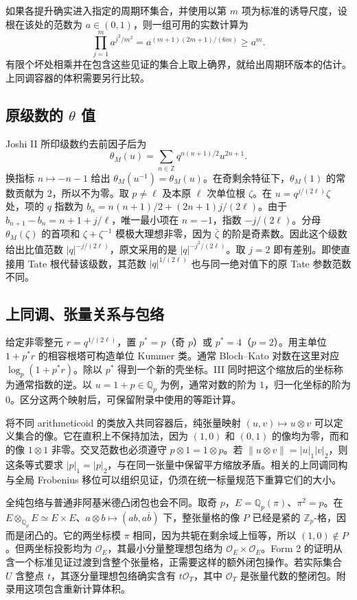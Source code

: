 \documentclass[UTF8,fontset=none,zihao=-4,a4paper]{ctexart}
\newcommand{\OO}{\mathcal O}
\newcommand{\Q}{\mathbb Q}
\newcommand{\Z}{\mathbb Z}
\begin{document}
如果各提升确实进入指定的周期环集合，并使用以第 \(m\) 项为标准的诱导尺度，设根在该处的范数为 \(a\in(0,1)\)，则一组可用的实数计算为
\[
 \prod_{j=1}^m a^{j^2/m^2}
 =a^{(m+1)(2m+1)/(6m)}\ge a^m.
\]
有限个坏处相乘并在包含这些见证的集合上取上确界，就给出周期环版本的估计。上同调容器的体积需要另行比较。\cite[III 的周期环估计和 Form 1]{jiii}

\subsection{原级数的 \texorpdfstring{\(\theta\)}{theta} 值}
Joshi II 所印级数约去前因子后为
\[
 \theta_M(u)=\sum_{n\in\Z}q^{n(n+1)/2}u^{2n+1}.
\]
换指标 \(n\mapsto-n-1\) 给出 \(\theta_M(u^{-1})=\theta_M(u)\)。在奇剩余特征下，\(\theta_M(1)\) 的常数贡献为 \(2\)，所以不为零。取 \(p\ne\ell\) 及本原 \(\ell\) 次单位根 \(\zeta\)。在 \(u=q^{j/(2\ell)}\zeta\) 处，项的 \(q\) 指数为 \(b_n=n(n+1)/2+(2n+1)j/(2\ell)\)。由于 \(b_{n+1}-b_n=n+1+j/\ell\)，唯一最小项在 \(n=-1\)，指数 \(-j/(2\ell)\)。分母 \(\theta_M(\zeta)\) 的首项和 \(\zeta+\zeta^{-1}\) 模极大理想非零，因为 \(\bar\zeta\) 的阶是奇素数。因此这个级数给出比值范数 \(|q|^{-j/(2\ell)}\)，原文采用的是 \(|q|^{-j^2/(2\ell)}\)。取 \(j=2\) 即有差别。即使直接用 Tate 根代替该级数，其范数 \(|q|^{1/(2\ell)}\) 也与同一绝对值下的原 Tate 参数范数不同。\cite[II 的 theta 函数与局部取值]{jii}\cite{jiii}

\subsection{上同调、张量关系与包络}
给定非零整元 \(r=q^{1/(2\ell)}\)，置 \(p^*=p\)（奇 \(p\)）或 \(p^*=4\)（\(p=2\)）。用主单位 \(1+p^*r\) 的相容根塔可构造单位 Kummer 类。通常 Bloch--Kato 对数在这里对应 \(\log_p(1+p^*r)\)。除以 \(p^*\) 得到一个新的壳坐标。III 同时把这个缩放后的坐标称为通常指数的逆。以 \(u=1+p\in\Q_p\) 为例，通常对数的阶为 \(1\)，归一化坐标的阶为 \(0\)。区分这两个映射后，可保留附录中使用的等距计算。\cite[III 的 Kummer 类和 log-shell]{jiii}

将不同 arithmeticoid 的类放入共同容器后，纯张量映射 \((u,v)\mapsto u\otimes v\) 可以定义集合的像。它在直积上不保持加法，因为 \((1,0)\) 和 \((0,1)\) 的像均为零，而和的像 \(1\otimes1\) 非零。交叉范数也必须遵守 \(p\otimes1=1\otimes p\)。若 \(\|u\otimes v\|=|u|_1|v|_2\)，则这条等式要求 \(|p|_1=|p|_2\)，与在同一张量中保留平方缩放矛盾。相关的上同调同构与全局 Frobenius 移位可以组织见证，仍须在统一标量规范下重算它们的大小。\cite{jhalf,jiii,jiv,janab,jalg}

全纯包络与普通非阿基米德凸闭包也会不同。取奇 \(p\)，\(E=\Q_p(\pi)\)、\(\pi^2=p\)。在 \(E\otimes_{\Q_p}E\simeq E\times E\)、\(a\otimes b\mapsto(ab,a\bar b)\) 下，整张量格的像 \(P\) 已经是紧的 \(\Z_p\)-格，因而是闭凸的。它的两坐标模 \(\pi\) 相同，因为共轭在剩余域上恒等，所以 \((1,0)\notin P\)。但两坐标投影均为 \(\OO_E\)，其最小分量整理想包络为 \(\OO_E\times\OO_E\)。Form 2 的证明从含一个标准见证过渡到含整个张量格，正需要这样的额外闭包操作。若实际集合 \(U\) 含整点 \(t\)，其逐分量理想包络确实含有 \(t\OO_T\)，其中 \(\OO_T\) 是张量代数的整闭包。附录用这项包含重新计算体积。\cite[III 的 holomorphic hull、体积引理和 Form 2]{jiii}
\end{document}
